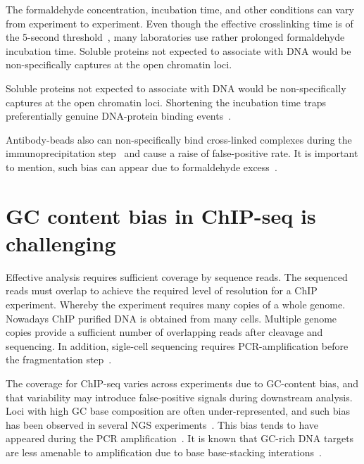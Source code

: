The formaldehyde concentration, incubation time, and other conditions can vary from experiment to experiment. 
Even though the effective crosslinking time is of the 5-second threshold~\cite{schmiedeberg2009temporal}, many laboratories use rather prolonged formaldehyde incubation time.
Soluble proteins not expected to associate with DNA would be non-specifically captures at the open chromatin loci.

Soluble proteins not expected to associate with DNA would be non-specifically captures at the open chromatin loci. Shortening the incubation time traps preferentially genuine DNA-protein binding events~\cite{baranello2016chip}.

Antibody-beads also can non-specifically bind cross-linked complexes during the immunoprecipitation step~\cite{zhu2014fast} and cause a raise of false-positive rate.
It is important to mention, such bias can appear due to formaldehyde excess~\cite{hanson2018using}.



\section{GC content bias in ChIP-seq is challenging}
Effective analysis requires sufficient coverage by sequence reads. 
The sequenced reads must overlap to achieve the required level of resolution for a ChIP experiment.
Whereby the experiment requires many copies of a whole genome.
Nowadays ChIP purified DNA is obtained from many cells.
Multiple genome copies provide a sufficient number of overlapping reads after cleavage and sequencing.
In addition, sigle-cell sequencing requires PCR-amplification before the fragmentation step~\cite{clark2016single}.


The coverage for ChIP-seq varies across experiments due to GC-content bias, and that variability may introduce false-positive signals during downstream analysis.
Loci with high GC base composition are often under-represented, and such bias has been observed in several NGS experiments~\cite{benjamini2012summarizing,dohm2008substantial,teng2017accounting}.
This bias tends to have appeared during the PCR amplification~\cite{ross2013characterizing}.
It is known that GC-rich DNA targets are less amenable to amplification due to base base-stacking interations~\cite{yakovchuk2006base}.

